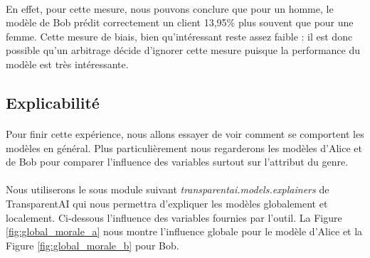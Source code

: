 \documentclass[10pt, french, a4paper]{report}
\begin{document}
\paragraph{}
En effet, pour cette mesure, nous pouvons conclure que pour un homme, le modèle de Bob prédit correctement un client 13,95\% plus souvent que pour une femme. Cette mesure de biais, bien qu'intéressant reste assez faible : il est donc possible qu'un arbitrage décide d'ignorer cette mesure puisque la performance du modèle est très intéressante. 

\subsection{Explicabilité}

\paragraph{}
Pour finir cette expérience, nous allons essayer de voir comment se comportent les modèles en général. Plus particulièrement nous regarderons les modèles d'Alice et de Bob pour comparer l'influence des variables surtout sur l'attribut du genre. 

\paragraph{}
Nous utiliserons le sous module suivant \textit{transparentai.models.explainers} de TransparentAI qui nous permettra d'expliquer les modèles globalement et localement. Ci-dessous l'influence des variables fournies par l'outil. La Figure \ref{fig:global_morale_a} nous montre l'influence globale pour le modèle d'Alice et la Figure \ref{fig:global_morale_b} pour Bob. 
\end{document}
